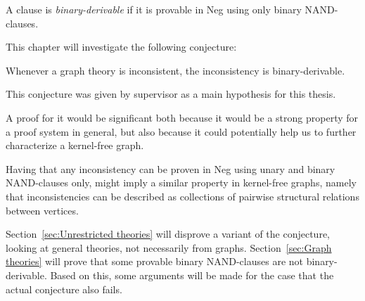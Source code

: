 

\begin{definition}
  A clause is \textit{binary-derivable} if it is provable in Neg using only binary NAND-clauses.
\end{definition}
This chapter will investigate the following conjecture:
\begin{conjecture}
  Whenever a graph theory is inconsistent, the inconsistency is binary-derivable.
\end{conjecture}
This conjecture was given by supervisor as a main hypothesis for this thesis.

A proof for it would be significant both because it would be a strong property for a proof system in general, but also because it could potentially help us to further characterize a kernel-free graph.

Having that any inconsistency can be proven in Neg using unary and binary NAND-clauses only, might imply a similar property in kernel-free graphs, namely that inconsistencies can be described as collections of pairwise structural relations between vertices.

Section~\ref{sec:Unrestricted theories} will disprove a variant of the conjecture, looking at general theories, not necessarily from graphs.
Section~\ref{sec:Graph theories} will prove that some provable binary NAND-clauses are not binary-derivable.
Based on this, some arguments will be made for the case that the actual conjecture also fails.
